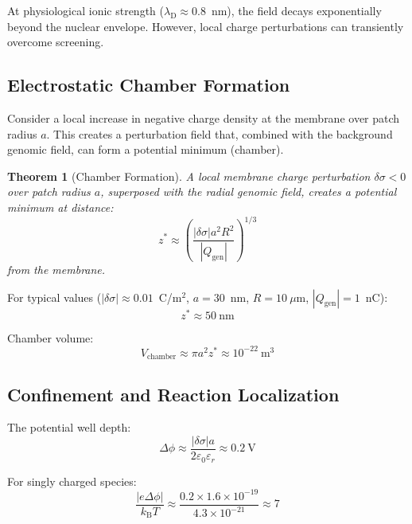 \documentclass[twocolumn,aps,prb,superscriptaddress,longbibliography,floatfix]{revtex4-2}
\newtheorem{theorem}{Theorem}[section]
\theoremstyle{remark}
\newcommand{\kB}{k_\text{B}}
\newcommand{\Qgen}{Q_\text{gen}}
\newcommand{\lambdaD}{\lambda_\text{D}}
\begin{document}
At physiological ionic strength ($\lambdaD \approx 0.8$~nm), the field
decays exponentially beyond the nuclear envelope. However, local charge
perturbations can transiently overcome screening.

\subsection{Electrostatic Chamber Formation}

Consider a local increase in negative charge density at the membrane
over patch radius $a$. This creates a perturbation field that, combined
with the background genomic field, can form a potential minimum
(chamber).

\begin{theorem}[Chamber Formation]
\label{thm:chamber}
A local membrane charge perturbation $\delta\sigma < 0$ over patch
radius $a$, superposed with the radial genomic field, creates a
potential minimum at distance:
\begin{equation}
z^* \approx \left(\frac{|\delta\sigma| a^2 R^2}{|\Qgen|}\right)^{1/3}
\label{eq:chamber_distance}
\end{equation}
from the membrane.
\end{theorem}

For typical values ($|\delta\sigma| \approx 0.01$~C/m$^2$, $a = 30$~nm,
$R = 10~\mu$m, $|\Qgen| = 1$~nC):
\begin{equation}
z^* \approx 50~\text{nm}
\end{equation}

Chamber volume:
\begin{equation}
V_\text{chamber} \approx \pi a^2 z^* \approx 10^{-22}~\text{m}^3
\end{equation}

\subsection{Confinement and Reaction Localization}

The potential well depth:
\begin{equation}
\Delta\phi \approx \frac{|\delta\sigma| a}{2\varepsilon_0\varepsilon_r} \approx 0.2~\text{V}
\end{equation}

For singly charged species:
\begin{equation}
\frac{|e\Delta\phi|}{\kB T} \approx \frac{0.2 \times 1.6 \times 10^{-19}}{4.3 \times 10^{-21}} \approx 7
\end{equation}
\end{document}
